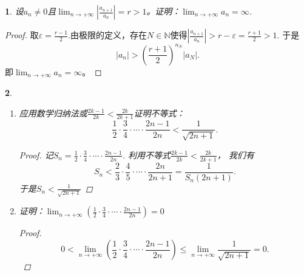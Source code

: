 \documentclass[utf8]{book}
\newtheorem{example}{}[section]             %
\begin{document}
\begin{example}
设$a_n \neq 0$且$\displaystyle \lim_{n\to +\infty}\left|\frac{a_{n+1}}{a_n}\right| = r > 1$。证明：$\displaystyle \lim_{n\to +\infty}a_n = \infty$.
\end{example}
\begin{proof}
取$\varepsilon = \frac{r - 1}{2}$.由极限的定义，存在$N\in\mathbb{N}$使得$\left|\frac{a_{n+1}}{a_n}\right| > r - \varepsilon = \frac{r + 1}{2} > 1$. 
于是 $$\left|a_n\right| > \left(\frac{r+1}{2}\right)^{n_N}\left|a_N\right|.$$
即$\displaystyle \lim_{n\to +\infty}a_n = \infty$。
\end{proof}
\begin{example}

\renewcommand\labelenumi{\normalfont(\theenumi)}
\begin{enumerate}
\item 应用数学归纳法或$\displaystyle\frac{2k-1}{2k}<\frac{2k}{2k+1}$证明不等式：
$$\frac{1}{2}\cdot\frac{3}{4}\cdot\cdots\cdot\frac{2n-1}{2n} < \frac{1}{\sqrt{2n+1}}.$$
\begin{proof}
记$S_n = \frac{1}{2}\cdot\frac{3}{4}\cdot\cdots\cdot\frac{2n-1}{2n}$. 利用不等式$\displaystyle\frac{2k-1}{2k}<\frac{2k}{2k+1}$， 我们有
$$S_n < \frac{2}{3}\cdot\frac{4}{5}\cdot\cdots\cdot\frac{2n}{2n+1} = \frac{1}{S_n(2n+1)}.$$
于是$S_n < \frac{1}{\sqrt{2n+1}}$

\end{proof}

\item 证明：$\displaystyle \lim_{n\to +\infty}\left(\frac{1}{2}\cdot\frac{3}{4}\cdot\cdots\cdot\frac{2n-1}{2n}\right) = 0$
\begin{proof}
$$0<\displaystyle \lim_{n\to +\infty}\left(\frac{1}{2}\cdot\frac{3}{4}\cdot\cdots\cdot\frac{2n-1}{2n}\right) \leq \lim_{n\to +\infty}\frac{1}{\sqrt{2n+1}}=0.$$
\end{proof}
\end{enumerate}

\end{example}
\end{document}
